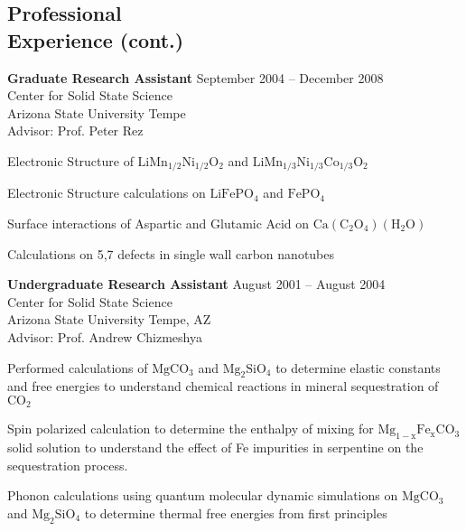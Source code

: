 \documentclass[margin,line]{resume}
\begin{document}
\begin{resume}
    \newpage
      \section{\mysidestyle Professional\\Experience (cont.)}
		\textbf{Graduate Research Assistant} \hfill September 2004 -- December 2008\vspace{1mm}\\
		Center for Solid State Science\\
Arizona State University Tempe\\
Advisor: Prof. Peter Rez\\\vspace{-1.5mm}
		\begin{list2}
			\item Electronic Structure of $\mathrm{LiMn_{1/2}Ni_{1/2}O_2}$ and $\mathrm{LiMn_{1/3}Ni_{1/3}Co_{1/3}O_2}$
			\item Electronic Structure calculations on $\mathrm{LiFePO_4}$ and $\mathrm{FePO_4}$
			\item Surface interactions of Aspartic and Glutamic Acid on $\mathrm{Ca(C_2O_4)(H_2O)}$
			\item Calculations on 5,7 defects in single wall carbon nanotubes
		\end{list2}


		\textbf{Undergraduate Research Assistant} \hfill August 2001 -- August 2004\vspace{1mm}\\
		Center for Solid State Science\\
Arizona State University Tempe, AZ\\
Advisor: Prof. Andrew Chizmeshya\\\vspace{-1.5mm}
		\begin{list2}
			\item Performed calculations of $\mathrm{MgCO_3}$ and $\mathrm{Mg_2SiO_4}$ to determine elastic constants and free energies to understand chemical reactions in mineral sequestration of $\mathrm{CO_2}$
		 \item Spin polarized calculation to determine the enthalpy of mixing for $\mathrm{Mg_{1-x}Fe_{x}CO_{3}}$ solid solution to understand the effect of Fe impurities in serpentine on the sequestration process.
		 \item Phonon calculations using quantum molecular dynamic simulations on $\mathrm{MgCO_3}$ and $\mathrm{Mg_2SiO_4}$ to determine thermal free energies from first principles
		\end{list2}
		

\end{resume}
\end{document}
